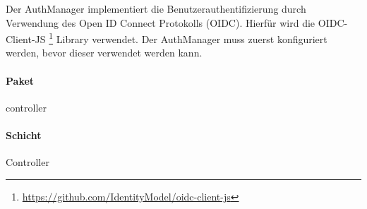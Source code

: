 Der AuthManager implementiert die Benutzerauthentifizierung durch Verwendung des Open ID Connect Protokolls (OIDC).
Hierfür wird die OIDC-Client-JS \footnote{\href{https://github.com/IdentityModel/oidc-client-js}{https://github.com/IdentityModel/oidc-client-js}} Library verwendet.
Der AuthManager muss zuerst konfiguriert werden, bevor dieser verwendet werden kann.

\paragraph*{Paket}
controller

\paragraph*{Schicht}
Controller